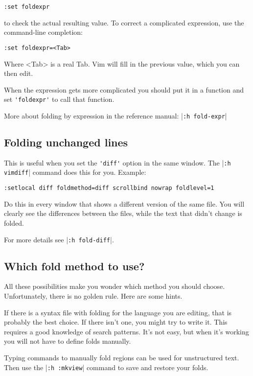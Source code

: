 \begin{Verbatim}[samepage=true]
 :set foldexpr
\end{Verbatim}

to check the actual resulting value.
To correct a complicated expression, use the command-line completion:

\begin{Verbatim}[samepage=true]
 :set foldexpr=<Tab>
\end{Verbatim}

Where <Tab> is a real Tab.
Vim will fill in the previous value, which you can then edit.

When the expression gets more complicated you should put it in a function and set \verb!'foldexpr'! to call that function.

More about folding by expression in the reference manual: |\verb!:h fold-expr!|
\subsection{Folding unchanged lines}
This is useful when you set the \verb!'diff'! option in the same window.
The |\verb!:h vimdiff!| command does this for you.
Example:

\begin{Verbatim}[samepage=true]
 :setlocal diff foldmethod=diff scrollbind nowrap foldlevel=1
\end{Verbatim}

Do this in every window that shows a different version of the same file.
You will clearly see the differences between the files, while the text that didn't change is folded.

For more details see |\verb!:h fold-diff!|.
\subsection{Which fold method to use?}
All these possibilities make you wonder which method you should choose.
Unfortunately, there is no golden rule.
Here are some hints.

If there is a syntax file with folding for the language you are editing, that is probably the best choice.
If there isn't one, you might try to write it.
This requires a good knowledge of search patterns.
It's not easy, but when it's working you will not have to define folds manually.

Typing commands to manually fold regions can be used for unstructured text.
Then use the |\verb!:h :mkview!| command to save and restore your folds.

